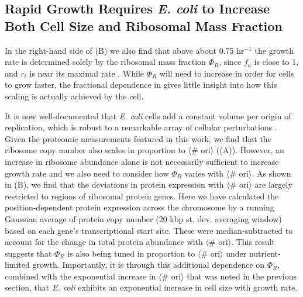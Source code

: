 \subsection{Rapid Growth Requires \textit{E. coli} to Increase Both Cell Size and Ribosomal
Mass Fraction}
In the right-hand side of (B) we also find that above about 0.75
hr$^{-1}$ the growth rate is determined solely by the ribosomal mass fraction
$\Phi_R$, since $f_a$ is close to 1, and $r_t$ is near its maximal rate
\citep{dai2016}. While $\Phi_R$ will need to increase in order for cells to
grow faster, the fractional dependence in 
gives little insight into how this scaling is actually achieved by the cell.

It is now well-documented that \textit{E. coli} cells add a constant volume per
origin of replication, which is robust to a remarkable array of cellular
perturbations \citep{si2017}. Given the proteomic measurements featured in this
work, we find that the ribosome copy number also scales in proportion to
$\langle$\# ori$\rangle$ ((A)). However,  an
increase in ribosome abundance alone is not necessarily sufficient to increase
growth rate and we also need to consider how $\Phi_R$ varies with $\langle$\#
ori$\rangle$. As shown in (B), we find
that the deviations in protein expression with $\langle$\# ori$\rangle$ are
largely restricted to regions of ribosomal protein genes. Here we have calculated the position-dependent
protein expression across the chromosome by a running Gaussian average of
protein copy number (20 kbp st. dev. averaging window) based on each gene's
transcriptional start site. These were median-subtracted to account for the
change in total protein abundance with $\langle$\# ori$\rangle$. This result
suggests that $\Phi_R$ is also being tuned in proportion to $\langle$\#
ori$\rangle$ under nutrient-limited growth. Importantly, it is through this
additional dependence on $\Phi_R$, combined with the exponential increase in
$\langle$\# ori$\rangle$ that was noted in the previous section, that \textit{E. coli}
exhibits an exponential increase in cell size with growth rate.

